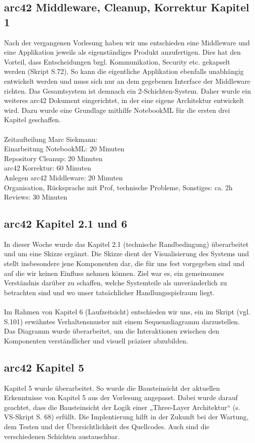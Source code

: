 \documentclass{article}
\begin{document}
\subsection{arc42 Middleware, Cleanup, Korrektur Kapitel 1}
Nach der vergangenen Vorlesung haben wir uns entschieden eine Middleware und eine Applikation jeweils als eigenständiges Produkt anzufertigen. Dies hat den Vorteil, dass Entscheidungen bzgl. Kommunikation, Security etc. gekapselt werden (Skript S.72). So kann die eigentliche Applikation ebenfalls unabhängig entwickelt werden und muss sich nur an dem gegebenen Interface der Middleware richten. Das Gesamtsystem ist demnach ein 2-Schichten-System. Daher wurde ein weiteres arc42 Dokument eingerichtet, in der eine eigene Architektur entwickelt wird. Dazu wurde eine Grundlage mithilfe NotebookML für die ersten drei Kapitel geschaffen.
\\\\
Zeitaufteilung Marc Siekmann:\\
Einarbeitung NotebookML: 20 Minuten\\
Repository Cleanup: 20 Minuten\\
arc42 Korrektur: 60 Minuten\\
Anlegen arc42 Middleware: 20 Minuten\\
Organisation, Rücksprache mit Prof, technische Probleme, Sonstiges: ca. 2h\\
Reviews: 30 Minuten

\subsection{arc42 Kapitel 2.1 und 6}
In dieser Woche wurde das Kapitel 2.1 (technische Randbedingung) überarbeitet und um eine Skizze ergänzt.
Die Skizze dient der Visualisierung des Systems und stellt insbesondere jene Komponenten dar, die für uns fest vorgegeben sind und auf die wir keinen Einfluss nehmen können.
Ziel war es, ein gemeinsames Verständnis darüber zu schaffen, welche Systemteile als unveränderlich zu betrachten sind und wo unser tatsächlicher Handlungsspielraum liegt.
\\\\
Im Rahmen von Kapitel 6 (Laufzeitsicht) entschieden wir uns, ein im Skript (vgl. S.101) erwähntes Verhaltensmuster mit einem Sequenzdiagramm darzustellen.
Das Diagramm wurde überarbeitet, um die Interaktionen zwischen den Komponenten verständlicher und visuell präziser abzubilden.

\subsection{arc42 Kapitel 5}
Kapitel 5 wurde überarbeitet.
So wurde die Bausteinsicht der aktuellen Erkenntnisse von Kapitel 5 aus der Vorlesung angepasst. 
Dabei wurde darauf geachtet, dass die Bausteinsicht der Logik einer „Three-Layer Architektur“ (s. VS-Skript S. 68) erfüllt.
Die Implentierung hilft in der Zukunft bei der Wartung, dem Testen und der Übersichtlichkeit des Quellcodes. Auch sind die verschiedenen Schichten austauschbar.
\end{document}
